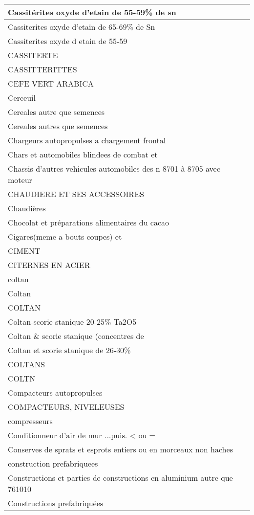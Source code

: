 \documentclass[
]{book}
\begin{document}
\begin{table}
\begin{tabular}[t]{l}
\hline
Cassitérites oxyde d'etain de 55-59\% de sn\\
\hline
Cassiterites oxyde d'etain de 65-69\% de Sn\\
\hline
Cassiterites oxyde d etain de 55-59\\
\hline
CASSITERTE\\
\hline
CASSITTERITTES\\
\hline
CEFE VERT ARABICA\\
\hline
Cerceuil\\
\hline
Cereales autre que semences\\
\hline
Cereales autres que semences\\
\hline
Chargeurs autopropulses a chargement frontal\\
\hline
Chars et automobiles blindees de combat et\\
\hline
Chassis d'autres vehicules automobiles des n 8701 à 8705 avec moteur\\
\hline
CHAUDIERE ET SES ACCESSOIRES\\
\hline
Chaudières\\
\hline
Chocolat et préparations alimentaires du cacao\\
\hline
Cigares(meme a bouts coupes) et\\
\hline
CIMENT\\
\hline
CITERNES EN ACIER\\
\hline
coltan\\
\hline
Coltan\\
\hline
COLTAN\\
\hline
Coltan-scorie stanique 20-25\% Ta2O5\\
\hline
Coltan \& scorie stanique (concentres de\\
\hline
Coltan et scorie stanique de 26-30\%\\
\hline
COLTANS\\
\hline
COLTN\\
\hline
Compacteurs autopropulses\\
\hline
COMPACTEURS, NIVELEUSES\\
\hline
compresseurs\\
\hline
Conditionneur d'air de mur ...puis. < ou =\\
\hline
Conserves de sprats et esprots entiers ou en morceaux non haches\\
\hline
construction prefabriquees\\
\hline
Constructions et parties de constructions en aluminium autre que 761010\\
\hline
Constructions prefabriquées\\

\end{tabular}
\end{table}
\end{document}
